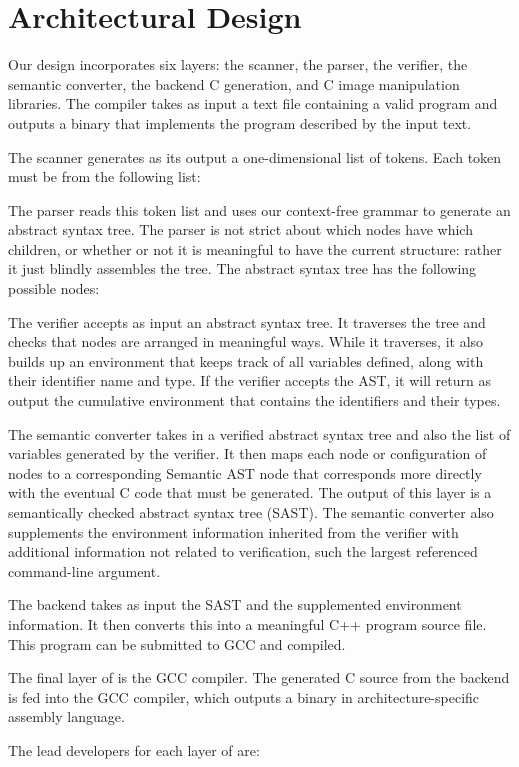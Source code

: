 \chapter{Architectural Design}
\label{chap:archdesign}



Our design incorporates six layers: the scanner, the parser, the verifier,
the semantic converter, the backend C generation, and C image manipulation
libraries. The compiler takes as input a text file containing a valid \sys{}
program and outputs a binary that implements the program described by the
input text.

The scanner generates as its output a one-dimensional list of tokens. Each
token must be from the following list:


The parser reads this token list and uses our context-free grammar to generate
an abstract syntax tree. The parser is not strict about which nodes have
which children, or whether or not it is meaningful to have the current
structure: rather it just blindly assembles the tree. The abstract syntax tree
has the following possible nodes:


The verifier accepts as input an abstract syntax tree. It traverses the
tree and checks that nodes are arranged in meaningful ways. While it
traverses, it also builds up an environment that keeps track of all
variables defined, along with their identifier name and type. If the
verifier accepts the AST, it will return as output the cumulative
environment that contains the identifiers and their types.

The semantic converter takes in a verified abstract syntax tree and also the
list of variables generated by the verifier. It then maps each node or
configuration of nodes to a corresponding Semantic AST node that
corresponds more directly with the eventual C code that must be generated.
The output of this layer is a semantically checked abstract syntax tree
(SAST). The semantic converter also supplements the environment information
inherited from the verifier with additional information not related to
verification, such the largest referenced command-line argument.


The backend takes as input the SAST and the supplemented environment
information. It then converts this into a meaningful C++ program source
file. This program can be submitted to GCC and compiled.

The final layer of \sys{} is the GCC compiler. The generated C source from
the backend is fed into the GCC compiler, which outputs a binary in
architecture-specific assembly language.

The lead developers for each layer of \sys{} are:

